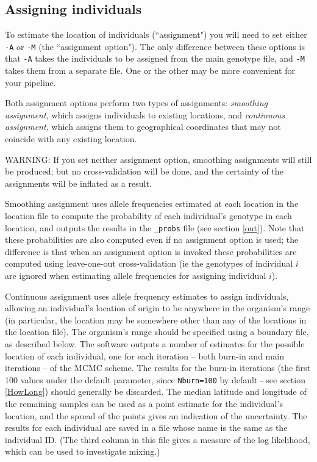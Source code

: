 \documentclass[10pt,titlepage,times,letterpaper]{article}
\begin{document}
\subsection{Assigning individuals}  \label{assign}

To estimate the location of individuals (``assignment") you will need
to set either {\tt -A} or {\tt -M} (the ``assignment option").  The
only difference between these options is that {\tt -A} takes the
individuals to be assigned from the main genotype file, and {\tt -M}
takes them from a separate file.  One or the other may be more
convenient for your pipeline.  

Both assignment options perform two types of assignments: {\it smoothing
 assignment,} which assigns individuals to existing locations, and 
{\it continuous assignment,} which
assigns them to geographical coordinates that may not coincide with any
existing location. 

WARNING:  If you set neither assignment option, smoothing assignments
will still be produced; but no cross-validation will be done, and the certainty of
the assignments will be inflated as a result.

Smoothing assignment uses allele frequencies estimated at each
location in the location file to compute the probability of each
individual's genotype in each location, and outputs the results in the
{\tt \_probs} file (see section \ref{out}). Note that these
probabilities are also computed even if no assignment option is
used; the difference is that when an assignment option is invoked these
probabilities are computed using leave-one-out cross-validation (ie
the genotypes of individual $i$ are ignored when estimating allele
frequencies for assigning individual $i$).

Continuous assignment uses allele frequency estimates to assign
individuals, allowing an individual's location of origin to be
anywhere in the organism's range (in particular, the location may
be somewhere other than any of the locations in the location
file). The organism's range should be specified using a
boundary file, as described below. The software outputs a number of
estimates for the possible location of each individual, one for each
iteration -- both burn-in and main iterations -- of the MCMC
scheme. The results for the burn-in iterations (the first 100 values
under the default parameter, since {\tt Nburn=100} by default - see section
\ref{HowLong}) should generally be discarded. The median latitude and
longitude of the remaining samples can be used as a point estimate for
the individual's location, and the spread of the points gives an
indication of the uncertainty. The results for each individual are saved 
in a file whose name is the same as the individual ID. (The third column in
this file gives a measure of the log likelihood, which can be
used to investigate mixing.)
\end{document}
